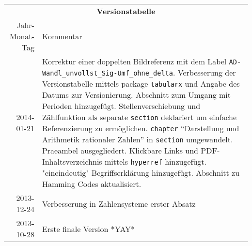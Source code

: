 \begin{table}[htp]
\centering
\begin{tabularx}{\columnwidth}{rp{}}
\multicolumn{2}{c}{\textbf{Versionstabelle}} \\
Jahr-Monat-Tag & Kommentar \\ \hline
2014-01-21 & Korrektur einer doppelten Bildreferenz mit dem Label \texttt{AD-Wandl\_unvollst\_Sig-Umf\_ohne\_delta}.  
Verbesserung der Versionstabelle mittels package \texttt{tabularx} und Angabe des Datums zur Versionierung. 
Abschnitt zum Umgang mit Perioden hinzugefügt. 
Stellenverschiebung und Zählfunktion als separate \texttt{section} deklariert um einfache Referenzierung zu ermöglichen.
\texttt{chapter} "`Darstellung und Arithmetik rationaler Zahlen"' in \texttt{section} umgewandelt. 
Praeambel ausgegliedert.
Klickbare Links und PDF-Inhaltsverzeichnis mittels \texttt{hyperref} hinzugefügt.
"eineindeutig" Begriffserklärung hinzugefügt.
Abschnitt zu Hamming Codes aktualisiert.
\\
2013-12-24 & Verbesserung in Zahlensysteme erster Absatz \\
2013-10-28 & Erste finale Version *YAY* \\
\end{tabularx}
\end{table}